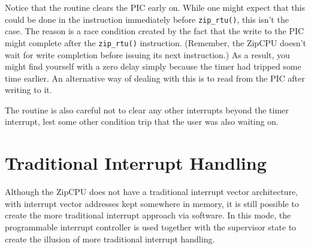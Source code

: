 \documentclass{gqtekspec}
\begin{document}
Notice that the routine clears the PIC early on.  While one might expect
that this could be done in the instruction immediately before {\tt zip\_rtu()},
this isn't the case.  The reason is a race condition created by the fact that
the write to the PIC might complete after the {\tt zip\_rtu()} instruction.
(Remember, the ZipCPU doesn't wait for write completion before issuing its
next instruction.)  As a result, you might find yourself with a zero delay
simply because the timer had tripped some time earlier.  An alternative way
of dealing with this is to read from the PIC after writing to it.

The routine is also careful not to clear any other interrupts beyond the timer
interrupt, lest some other condition trip that the user was also waiting on.
\section{Traditional Interrupt Handling}
Although the ZipCPU does not have a traditional interrupt vector architecture,
with interrupt vector addresses kept somewhere in memory, it is still
possible to create the more traditional interrupt approach via software.
In this mode, the programmable interrupt controller is used together with the
supervisor state to create the illusion of more traditional interrupt handling.
\end{document}
